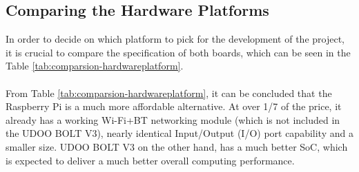 \subsection{Comparing the Hardware Platforms}

In order to decide on which platform to pick for the development of the project, it is crucial to compare the specification of both boards, which can be seen in the Table \ref{tab:comparsion-hardwareplatform}.

\paragraph{} From Table \ref{tab:comparsion-hardwareplatform}, it can be concluded that the Raspberry Pi is a much more affordable alternative. At over 1/7 of the price, it already has a working Wi-Fi+BT networking module (which is not included in the UDOO BOLT V3), nearly identical Input/Output (I/O) port capability and a smaller size. UDOO BOLT V3 on the other hand, has a much better SoC, which is expected to deliver a much better overall computing performance.

